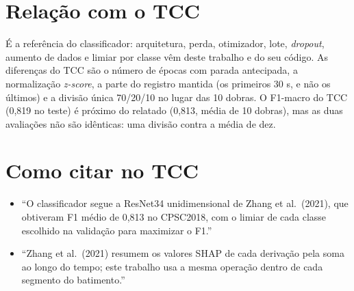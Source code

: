 \documentclass[11pt,a4paper]{article}
\begin{document}
\section{Relação com o TCC}
É a referência do classificador: arquitetura, perda, otimizador, lote, \textit{dropout}, aumento de dados e limiar por classe vêm deste trabalho e do seu código. As diferenças do TCC são o número de épocas com parada antecipada, a normalização \textit{z-score}, a parte do registro mantida (os primeiros 30 s, e não os últimos) e a divisão única 70/20/10 no lugar das 10 dobras. O F1-macro do TCC (0,819 no teste) é próximo do relatado (0,813, média de 10 dobras), mas as duas avaliações não são idênticas: uma divisão contra a média de dez.

\section{Como citar no TCC}
\begin{itemize}
\item ``O classificador segue a ResNet34 unidimensional de Zhang et al.\ (2021), que obtiveram F1 médio de 0,813 no CPSC2018, com o limiar de cada classe escolhido na validação para maximizar o F1.''
\item ``Zhang et al.\ (2021) resumem os valores SHAP de cada derivação pela soma ao longo do tempo; este trabalho usa a mesma operação dentro de cada segmento do batimento.''
\end{itemize}
\end{document}

